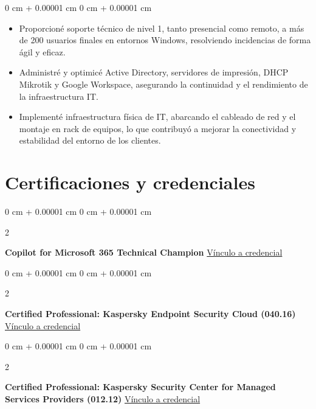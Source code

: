 \documentclass[10pt, letterpaper]{article}
\newenvironment{highlights}{
    \begin{itemize}[
        topsep=0.10 cm,
        parsep=0.10 cm,
        partopsep=0pt,
        itemsep=0pt,
        leftmargin=0 cm + 10pt
    ]
}{
    \end{itemize}
} %
\newenvironment{onecolentry}{
    \begin{adjustwidth}{
        0 cm + 0.00001 cm
    }{
        0 cm + 0.00001 cm
    }
}{
    \end{adjustwidth}
} %
\newenvironment{twocolentry}[2][]{
    \onecolentry
    \def\secondColumn{#2}
    \setcolumnwidth{\fill, 4.5 cm}
    \begin{paracol}{2}
}{
    \switchcolumn \raggedleft \secondColumn
    \end{paracol}
    \endonecolentry
} %
\begin{document}
\vspace{0.10 cm}
\begin{onecolentry}
    \begin{highlights}
        \item Proporcioné soporte técnico de nivel 1, tanto presencial como remoto, a más de 200 usuarios finales en entornos Windows, resolviendo incidencias de forma ágil y eficaz.
        \item Administré y optimicé Active Directory, servidores de impresión, DHCP Mikrotik y Google Workspace, asegurando la continuidad y el rendimiento de la infraestructura IT.
        \item Implementé infraestructura física de IT, abarcando el cableado de red y el montaje en rack de equipos, lo que contribuyó a mejorar la conectividad y estabilidad del entorno de los clientes.
    \end{highlights}
\end{onecolentry}


    
    \section{Certificaciones y credenciales}

        
        \begin{twocolentry}{
            \href{https://www.credly.com/badges/7b0b48ff-3c24-4583-adb0-31f8596de99b/linked_in_profile}{Vínculo a credencial}
        }
            \textbf{Copilot for Microsoft 365 Technical Champion}\end{twocolentry}

        \vspace{0.10 cm}
        \vspace{0.2 cm}

        \begin{twocolentry}{
            \href{https://certification.kaspersky.com/api/PageOfCertificate/ca679a69-c08d-4da2-af4d-8e8486097433}{Vínculo a credencial}
        }
            \textbf{Certified Professional: Kaspersky Endpoint Security Cloud (040.16)}\end{twocolentry}

        \vspace{0.10 cm}
        \vspace{0.2 cm}

        \begin{twocolentry}{
           \href{https://certification.kaspersky.com/api/PageOfCertificate/ceec7cef-af6d-47ae-b0b6-7d8cb8dea1e7}{Vínculo a credencial}
        }
            \textbf{Certified Professional: Kaspersky Security Center for Managed Services Providers (012.12)}\end{twocolentry}
\end{document}
